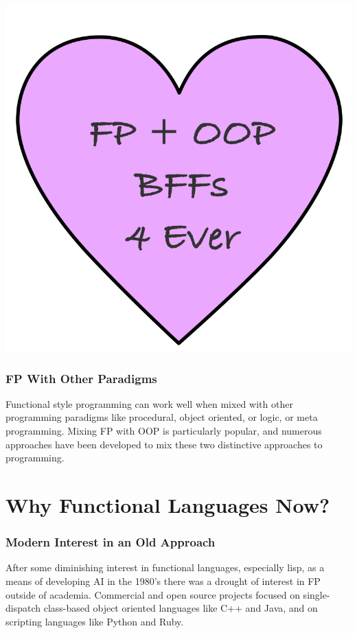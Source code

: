 \documentclass{beamer}
\begin{document}
\begin{frame}
  \begin{center}
    \includegraphics[height=.70\paperheight]{images/bffs.png}
  \end{center}
\end{frame}

\begin{frame}
  \frametitle{FP With Other Paradigms}
  Functional style programming can work well when mixed with other
  programming paradigms like procedural, object oriented, or logic, or
  meta programming.  Mixing FP with OOP is particularly popular, and
  numerous approaches have been developed to mix these two distinctive
  approaches to programming.
\end{frame}

\section{Why Functional Languages Now?}

\begin{frame}
  \frametitle{Modern Interest in an Old Approach}
  After some diminishing interest in functional languages, especially
  lisp, as a means of developing AI in the 1980's there was a drought
  of interest in FP outside of academia.  Commercial and open source
  projects focused on single-dispatch class-based object oriented
  languages like C++ and Java, and on scripting languages like Python
  and Ruby.
\end{frame}
\end{document}
